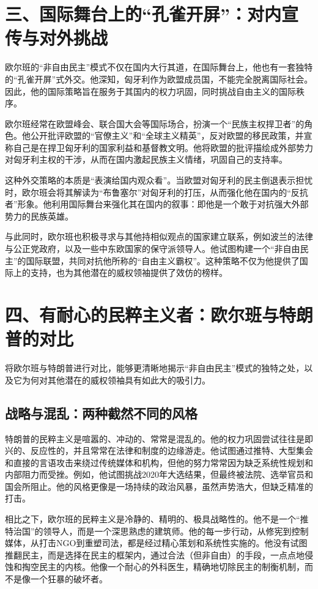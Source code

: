 \section{三、国际舞台上的“孔雀开屏”：对内宣传与对外挑战}

欧尔班的“非自由民主”模式不仅在国内大行其道，在国际舞台上，他也有一套独特的“孔雀开屏”式外交。他深知，匈牙利作为欧盟成员国，不能完全脱离国际社会。因此，他的国际策略旨在服务于其国内的权力巩固，同时挑战自由主义的国际秩序。

欧尔班经常在欧盟峰会、联合国大会等国际场合，扮演一个“民族主权捍卫者”的角色。他公开批评欧盟的“官僚主义”和“全球主义精英”，反对欧盟的移民政策，并宣称自己是在捍卫匈牙利的国家利益和基督教文明。他将欧盟的批评描绘成外部势力对匈牙利主权的干涉，从而在国内激起民族主义情绪，巩固自己的支持率。

这种外交策略的本质是“表演给国内观众看”。当欧盟对匈牙利的民主倒退表示担忧时，欧尔班会将其解读为“布鲁塞尔”对匈牙利的打压，从而强化他在国内的“反抗者”形象。他利用国际舞台来强化其在国内的叙事：即他是一个敢于对抗强大外部势力的民族英雄。

与此同时，欧尔班也积极寻求与其他持相似观点的国家建立联系，例如波兰的法律与公正党政府，以及一些中东欧国家的保守派领导人。他试图构建一个“非自由民主”的国际联盟，共同对抗他所称的“自由主义霸权”。这种策略不仅为他提供了国际上的支持，也为其他潜在的威权领袖提供了效仿的榜样。

\section{四、有耐心的民粹主义者：欧尔班与特朗普的对比}

将欧尔班与特朗普进行对比，能够更清晰地揭示“非自由民主”模式的独特之处，以及它为何对其他潜在的威权领袖具有如此大的吸引力。

\subsection{战略与混乱：两种截然不同的风格}

特朗普的民粹主义是喧嚣的、冲动的、常常是混乱的。他的权力巩固尝试往往是即兴的、反应性的，并且常常在法律和制度的边缘游走。他试图通过推特、大型集会和直接的言语攻击来绕过传统媒体和机构，但他的努力常常因为缺乏系统性规划和内部阻力而受挫。例如，他试图挑战2020年大选结果，但最终被法院、选举官员和国会所阻止。他的风格更像是一场持续的政治风暴，虽然声势浩大，但缺乏精准的打击。

相比之下，欧尔班的民粹主义是冷静的、精明的、极具战略性的。他不是一个“推特治国”的领导人，而是一个深思熟虑的建筑师。他的每一步行动，从修宪到控制媒体，从打击NGO到重塑司法，都是经过精心策划和系统性实施的。他没有试图推翻民主，而是选择在民主的框架内，通过合法（但非自由）的手段，一点点地侵蚀和掏空民主的内核。他像一个耐心的外科医生，精确地切除民主的制衡机制，而不是像一个狂暴的破坏者。


